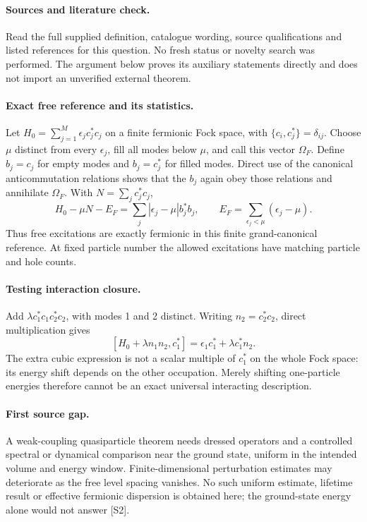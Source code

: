 \documentclass[11pt]{article}
\begin{document}
\paragraph{Sources and literature check.}
Read the full supplied definition, catalogue wording, source qualifications and listed references for this question. No fresh status or novelty search was performed. The argument below proves its auxiliary statements directly and does not import an unverified external theorem.

\paragraph{Exact free reference and its statistics.} Let \(H_0=\sum_{j=1}^M\epsilon_j c_j^*c_j\) on a finite fermionic Fock space, with \(\{c_i,c_j^*\}=\delta_{ij}\). Choose \(\mu\) distinct from every \(\epsilon_j\), fill all modes below \(\mu\), and call this vector \(\Omega_F\). Define \(b_j=c_j\) for empty modes and \(b_j=c_j^*\) for filled modes. Direct use of the canonical anticommutation relations shows that the \(b_j\) again obey those relations and annihilate \(\Omega_F\). With \(N=\sum_jc_j^*c_j\),
\[
 H_0-\mu N-E_F=\sum_j|\epsilon_j-\mu|b_j^*b_j,
 \qquad E_F=\sum_{\epsilon_j<\mu}(\epsilon_j-\mu).
\]
Thus free excitations are exactly fermionic in this finite grand-canonical reference. At fixed particle number the allowed excitations have matching particle and hole counts.
\paragraph{Testing interaction closure.} Add \(\lambda c_1^*c_1c_2^*c_2\), with modes 1 and 2 distinct. Writing \(n_2=c_2^*c_2\), direct multiplication gives
\[
 [H_0+\lambda n_1n_2,c_1^*]
 =\epsilon_1c_1^*+\lambda c_1^*n_2.
\]
The extra cubic expression is not a scalar multiple of \(c_1^*\) on the whole Fock space: its energy shift depends on the other occupation. Merely shifting one-particle energies therefore cannot be an exact universal interacting description.
\paragraph{First source gap.} A weak-coupling quasiparticle theorem needs dressed operators and a controlled spectral or dynamical comparison near the ground state, uniform in the intended volume and energy window. Finite-dimensional perturbation estimates may deteriorate as the free level spacing vanishes. No such uniform estimate, lifetime result or effective fermionic dispersion is obtained here; the ground-state energy alone would not answer [S2].
\end{document}

